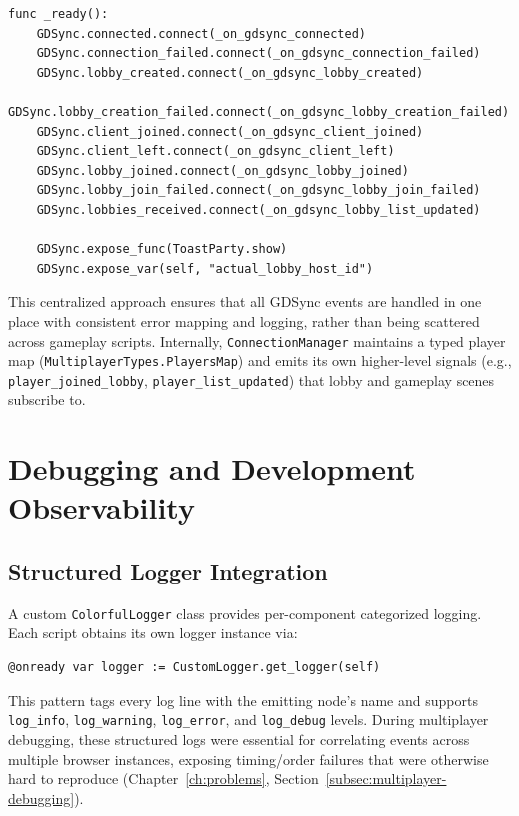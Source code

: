 \begin{lstlisting}[caption={GDSync signal wiring (connection\_manager.gd)}]
func _ready():
    GDSync.connected.connect(_on_gdsync_connected)
    GDSync.connection_failed.connect(_on_gdsync_connection_failed)
    GDSync.lobby_created.connect(_on_gdsync_lobby_created)
    GDSync.lobby_creation_failed.connect(_on_gdsync_lobby_creation_failed)
    GDSync.client_joined.connect(_on_gdsync_client_joined)
    GDSync.client_left.connect(_on_gdsync_client_left)
    GDSync.lobby_joined.connect(_on_gdsync_lobby_joined)
    GDSync.lobby_join_failed.connect(_on_gdsync_lobby_join_failed)
    GDSync.lobbies_received.connect(_on_gdsync_lobby_list_updated)

    GDSync.expose_func(ToastParty.show)
    GDSync.expose_var(self, "actual_lobby_host_id")
\end{lstlisting}

This centralized approach ensures that all GDSync events are handled in one place with consistent error mapping and logging, rather than being scattered across gameplay scripts. Internally, \texttt{ConnectionManager} maintains a typed player map (\texttt{MultiplayerTypes.PlayersMap}) and emits its own higher-level signals (e.g., \texttt{player\_joined\_lobby}, \texttt{player\_list\_updated}) that lobby and gameplay scenes subscribe to.

\section{Debugging and Development Observability}
\label{sec:debugging-tools}

\subsection{Structured Logger Integration}
\label{subsec:logger-integration}

A custom \texttt{ColorfulLogger} class provides per-component categorized logging. Each script obtains its own logger instance via:

\begin{lstlisting}[caption={Logger instantiation pattern}]
@onready var logger := CustomLogger.get_logger(self)
\end{lstlisting}

This pattern tags every log line with the emitting node's name and supports \texttt{log\_info}, \texttt{log\_warning}, \texttt{log\_error}, and \texttt{log\_debug} levels. During multiplayer debugging, these structured logs were essential for correlating events across multiple browser instances, exposing timing/order failures that were otherwise hard to reproduce (Chapter~\ref{ch:problems}, Section~\ref{subsec:multiplayer-debugging}).

